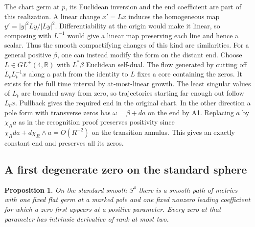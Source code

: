 \documentclass[11pt,letterpaper]{article}
\numberwithin{equation}{section}
\newtheorem{proposition}{Proposition}[section]
\begin{document}
The chart germ at \(p\), its Euclidean inversion and the end
coefficient are part of this realization. A linear change \(x'=Lx\)
induces the homogeneous map \(y'=|y|^2Ly/|Ly|^2\). Differentiability
at the origin would make it linear, so composing with \(L^{-1}\)
would give a linear map preserving each line and hence a scalar.
Thus the smooth compactifying changes of this kind are similarities.
For a general positive \(\beta\), one can instead modify the form
on the distant end. Choose \(L\in GL^+(4,\mathbb R)\) with
\(L^*\beta\) Euclidean self-dual. The flow generated by cutting off
\(\dot L_tL_t^{-1}x\) along a path from the identity to \(L\) fixes a
core containing the zeros. It exists for the full time interval by
at-most-linear growth. The least singular values of \(L_t\) are bounded
away from zero, so trajectories starting far enough out follow \(L_t x\).
Pullback gives the required end in the original chart. In the
other direction a pole form with transverse zeros has
\(\omega=\beta+da\) on the end by A1. Replacing \(a\) by
\(\chi_R a\) as in the recognition proof preserves positivity since
\(\chi_R da+d\chi_R\wedge a=O(R^{-2})\) on the transition annulus.
This gives an exactly constant end and preserves all its zeros.

\subsection{A first degenerate zero on the standard sphere}

\begin{proposition}\label{prop:pole-degenerate-first-zero}
On the standard smooth \(S^4\) there is a smooth path of metrics
with one fixed flat germ at a marked pole and one fixed nonzero
leading coefficient for which a zero first appears at a positive
parameter. Every zero at that parameter has intrinsic derivative of
rank at most two.
\end{proposition}
\end{document}
